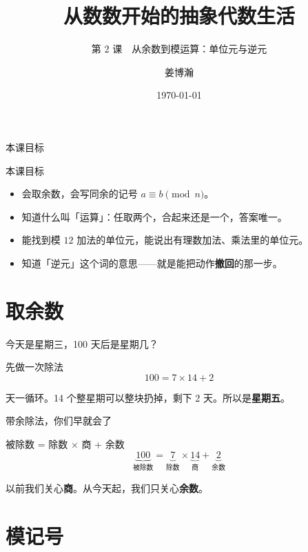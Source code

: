 \documentclass[10pt]{beamer}
\title{从数数开始的抽象代数生活}
\subtitle{第 2 课　从余数到模运算：单位元与逆元}
\author{姜博瀚}
\institute{厦门大学附属实验中学}
\date{\today}
\begin{document}
\begin{frame}
  \titlepage
\end{frame}

\begin{frame}{本课目标}
  \begin{block}{本课目标}
    \begin{itemize}
      \item 会取余数，会写同余的记号 \(a\equiv b\pmod n\)。
      \item 知道什么叫「运算」：任取两个，合起来还是一个，答案唯一。
      \item 能找到模 \(12\) 加法的单位元，能说出有理数加法、乘法里的单位元。
      \item 知道「逆元」这个词的意思——就是能把动作\textbf{撤回}的那一步。
    \end{itemize}
  \end{block}
\end{frame}

\section{取余数}

\begin{frame}{今天是星期三，100 天后是星期几？}
  \pause
  \begin{block}{先做一次除法}
    \[
      100 = 7 \times 14 + 2
    \]
  \end{block}
   天一循环。14 个整星期可以整块扔掉，剩下 2 天。\pause 所以是\textbf{星期五}。
\end{frame}

\begin{frame}{带余除法，你们早就会了}
  \begin{block}{被除数 = 除数 × 商 + 余数}
    \[
      \underbrace{100}_{\text{被除数}} = \underbrace{7}_{\text{除数}} \times \underbrace{14}_{\text{商}} + \underbrace{2}_{\text{余数}}
    \]
  \end{block}
  \pause
  以前我们关心\textbf{商}。\pause 从今天起，我们只关心\textbf{余数}。
\end{frame}

\section{模记号}
\end{document}

